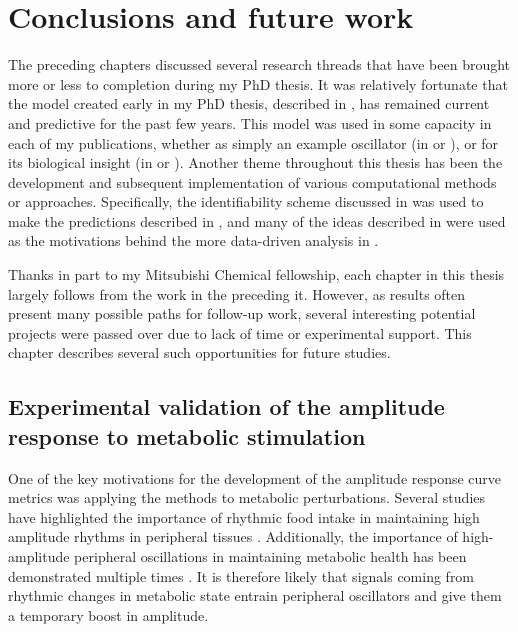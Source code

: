\chapter{Conclusions and future work}

The preceding chapters discussed several research threads that have been brought more or less to completion during my PhD thesis.
It was relatively fortunate that the model created early in my PhD thesis, described in , has remained current and predictive for the past few years.
This model was used in some capacity in each of my publications, whether as simply an example oscillator (in  or ), or for its biological insight (in  or ).
Another theme throughout this thesis has been the development and subsequent implementation of various computational methods or approaches.
Specifically, the identifiability scheme discussed in  was used to make the predictions described in , and many of the ideas described in  were used as the motivations behind the more data-driven analysis in .

Thanks in part to my Mitsubishi Chemical fellowship, each chapter in this thesis largely follows from the work in the preceding it.
However, as results often present many possible paths for follow-up work, several interesting potential projects were passed over due to lack of time or experimental support.
This chapter describes several such opportunities for future studies.

\section{Experimental validation of the amplitude response to metabolic stimulation}\label{sec:chida}

One of the key motivations for the development of the amplitude response curve metrics was applying the methods to metabolic perturbations.
Several studies have highlighted the importance of rhythmic food intake in maintaining high amplitude rhythms in peripheral tissues \cite{Vollmers2009, Hatori2012}.
Additionally, the importance of high-amplitude peripheral oscillations in maintaining metabolic health has been demonstrated multiple times \cite{Hatori2012, Marcheva2010}.
It is therefore likely that signals coming from rhythmic changes in metabolic state entrain peripheral oscillators and give them a temporary boost in amplitude.

